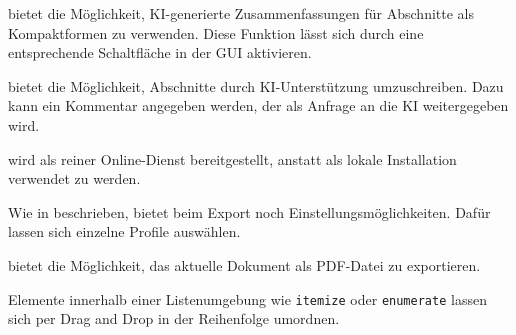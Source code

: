 
\texla{} bietet die Möglichkeit, KI-generierte Zusammenfassungen für Abschnitte als Kompaktformen zu verwenden.
Diese Funktion lässt sich durch eine entsprechende Schaltfläche in der GUI aktivieren.


\texla{} bietet die Möglichkeit, Abschnitte durch KI-Unterstützung umzuschreiben.
Dazu kann ein Kommentar angegeben werden, der als Anfrage an die KI weitergegeben wird.


\texla{} wird als reiner Online-Dienst bereitgestellt, anstatt als lokale Installation verwendet zu werden.


Wie in  beschrieben, bietet \texla{} beim Export noch Einstellungsmöglichkeiten.
Dafür lassen sich einzelne Profile auswählen.


\texla{} bietet die Möglichkeit, das aktuelle Dokument als PDF-Datei zu exportieren.

\clearpage


Elemente innerhalb einer Listenumgebung wie \verb|itemize| oder \verb|enumerate| lassen sich per Drag and Drop in der
Reihenfolge umordnen.

